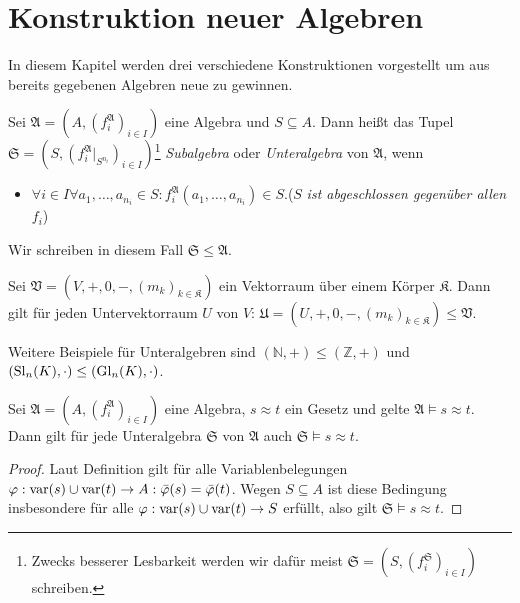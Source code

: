 \section{Konstruktion neuer Algebren}

In diesem Kapitel werden drei verschiedene Konstruktionen vorgestellt um aus bereits gegebenen Algebren neue zu gewinnen.

\begin{definition}
    Sei $\mathfrak{A}=(A,(f^\mathfrak{A}_i)_{i\in I})$ eine Algebra und $S\subseteq A$. Dann heißt das Tupel $\mathfrak{S}=(S,(f^\mathfrak{A}_i|_{S^{n_i}})_{i\in I})$\footnote{Zwecks besserer Lesbarkeit werden wir dafür meist $\mathfrak{S}=(S,(f^\mathfrak{S}_i)_{i\in I})$ schreiben.}
    \emph{Subalgebra} oder \emph{Unteralgebra} von $\mathfrak{A}$, wenn
    \begin{itemize}[topsep=0pt, label={--}]
        \item $\forall i\in I\forall a_1,\ldots,a_{n_i}\in S:f^\mathfrak{A}_i(a_1,\ldots,a_{n_i})\in S.$\tab ($S$ \emph{ist abgeschlossen gegenüber allen} $f_i$)
    \end{itemize}
    Wir schreiben in diesem Fall $\mathfrak{S}\le \mathfrak{A}$.
\end{definition}

\begin{example}
    Sei $\mathfrak{V}=(V,+,0,-,(m_k)_{k\in\mathfrak{K}})$ ein Vektorraum über einem Körper $\mathfrak{K}$. Dann gilt für
    jeden Untervektorraum $U$ von $V$: $\mathfrak{U}=(U,+,0,-,(m_k)_{k\in\mathfrak{K}})\le \mathfrak{V}$. 
    
    Weitere Beispiele für Unteralgebren sind $(\mathbb{N},+)\le(\mathbb{Z},+)$ und $(\operatorname{Sl}_n(K),\cdot)\le (\operatorname{Gl}_n(K),\cdot)$.
\end{example}

\begin{proposition}\label{prop:unteralgebra}
    Sei $\mathfrak{A}=(A,(f^\mathfrak{A}_i)_{i\in I})$ eine Algebra, $s\approx t$ ein Gesetz und gelte $\mathfrak{A}\models s\approx t$.
    Dann gilt für jede Unteralgebra $\mathfrak{S}$ von $\mathfrak{A}$ auch $\mathfrak{S}\models s\approx t$.
\end{proposition}

\begin{proof}
    Laut Definition gilt für alle Variablenbelegungen $\varphi:\operatorname{var}(s)\cup \operatorname{var}(t)\to A:\bar{\varphi}(s)=\bar{\varphi}(t)$.
    Wegen $S\subseteq A$ ist diese Bedingung insbesondere für alle $\varphi : \operatorname{var}(s) \cup \operatorname{var}(t) \to S$ erfüllt, also gilt $\mathfrak{S}\models s\approx t$.
\end{proof}

